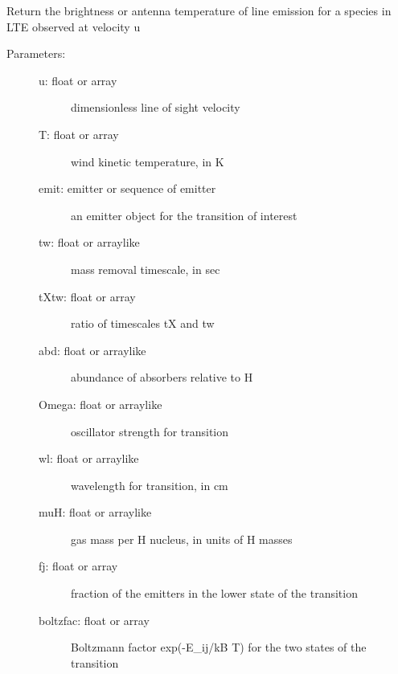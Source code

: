 \documentclass[letterpaper,10pt,english]{sphinxmanual}
\begin{document}
\begin{fulllineitems}
\begin{fulllineitems}
\label{fulldoc:despotic.winds.pwind.temp_LTE}
Return the brightness or antenna temperature of line emission
for a species in LTE observed at velocity u
\begin{description}
\item[{Parameters:}] \leavevmode\begin{description}
\item[{u: float or array}] \leavevmode
dimensionless line of sight velocity

\item[{T: float or array}] \leavevmode
wind kinetic temperature, in K

\item[{emit: emitter or sequence of emitter}] \leavevmode
an emitter object for the transition of interest

\item[{tw: float or arraylike}] \leavevmode
mass removal timescale, in sec

\item[{tXtw: float or array}] \leavevmode
ratio of timescales tX and tw

\item[{abd: float or arraylike}] \leavevmode
abundance of absorbers relative to H

\item[{Omega: float or arraylike}] \leavevmode
oscillator strength for transition

\item[{wl: float or arraylike}] \leavevmode
wavelength for transition, in cm

\item[{muH: float or arraylike}] \leavevmode
gas mass per H nucleus, in units of H masses

\item[{fj: float or array}] \leavevmode
fraction of the emitters in the lower state of the
transition

\item[{boltzfac: float or array}] \leavevmode
Boltzmann factor exp(-E\_ij/kB T) for the two states of
the transition


\end{description}
\end{description}
\end{fulllineitems}
\end{fulllineitems}
\end{document}
